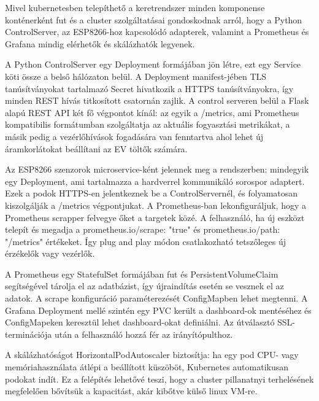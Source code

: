 Mivel kubernetesben telepíthető a keretrendszer minden komponense konténerként fut 
és a cluster szolgáltatásai gondoskodnak arról, hogy a Python ControlServer, az ESP8266-hoz kapcsolódó adapterek, 
valamint a Prometheus és Grafana mindig elérhetők és skálázhatók legyenek.

A Python ControlServer egy Deployment formájában jön létre, ezt egy Service köti össze a belső hálózaton belül. 
A Deployment manifest-jében TLS tanúsítványokat tartalmazó Secret hivatkozik a HTTPS tanúsítványokra, 
így minden REST hívás titkosított csatornán zajlik. A control serveren belül a Flask alapú REST API két fő végpontot kínál: 
az egyik a /metrics, ami Prometheus kompatibilis formátumban szolgáltatja az aktuális fogyasztási metrikákat, 
a másik pedig a vezérlőhívások fogadására van fenntartva ahol lehet új áramkorlátokat beállítani az EV töltők számára.

Az ESP8266 szenzorok microservice-ként jelennek meg a rendszerben: mindegyik egy Deployment, 
ami tartalmazza a hardverrel kommunikáló sorospor adaptert. 
Ezek a podok HTTPS-en jelentkeznek be a ControlServernél, és folyamatosan kiszolgálják a /metrics végpontjukat. 
A Prometheus-ban lekonfiguráljuk, hogy a Prometheus scrapper felvegye őket a targetek közé. 
A felhasználó, ha új eszközt telepít és megadja a prometheus.io/scrape: "true" és prometheus.io/path: "/metrics" értékeket. 
Így plug and play módon csatlakozható tetszőleges új érzékelők vagy vezérlők.

A Prometheus egy StatefulSet formájában fut és PersistentVolumeClaim segítségével tárolja el az adatbázist, 
így újraindítás esetén se vesznek el az adatok. A scrape konfiguráció paraméterezését ConfigMapben lehet megtenni. 
A Grafana Deployment mellé szintén egy PVC került a dashboard-ok mentéséhez 
és ConfigMapeken keresztül lehet dashboard-okat definiálni. Az útválasztó SSL-terminációja 
után a felhasználó hozzá fér az irányítópulthoz.

A skálázhatóságot HorizontalPodAutoscaler biztosítja: ha egy pod CPU- vagy memóriahasználata átlépi a beállított küszöböt, 
Kubernetes automatikusan podokat indít. Ez a felépítés lehetővé teszi, 
hogy a cluster pillanatnyi terhelésének megfelelően bővítsük a kapacitást, akár kibőtve külső linux VM-re.
